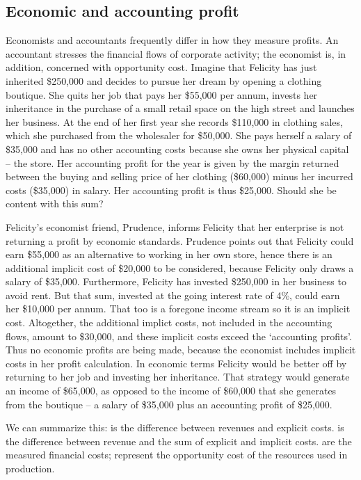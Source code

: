 \newhtmlpage

\subsection*{Economic and accounting profit}

Economists and accountants frequently differ in how they measure profits. An
accountant stresses the financial flows of corporate activity; the economist
is, in addition, concerned with opportunity cost. Imagine that Felicity has
just inherited \$250,000 and decides to pursue her dream by opening a
clothing boutique. She quits her job that pays her \$55,000 per annum,
invests her inheritance in the purchase of a small retail space on the high
street and launches her business. At the end of her first year she records
\$110,000 in clothing sales, which she purchased from the wholesaler for
\$50,000. She pays herself a salary of \$35,000 and has no other accounting
costs because she owns her physical capital -- the store. Her accounting
profit for the year is given by the margin returned between the buying and
selling price of her clothing (\$60,000) minus her incurred costs
(\$35,000) in salary. Her accounting profit is thus \$25,000. Should she be
content with this sum?

Felicity's economist friend, Prudence, informs Felicity that her enterprise
is not returning a profit by economic standards. Prudence points out that
Felicity could earn \$55,000 as an alternative to working in her own store,
hence there is an additional implicit cost of \$20,000 to be considered,
because Felicity only draws a salary of \$35,000. Furthermore, Felicity has
invested \$250,000 in her business to avoid rent. But that sum, invested at
the going interest rate of 4\%, could earn her \$10,000 per annum. That too
is a foregone income stream so it is an implicit cost. Altogether, the
additional implict costs, not included in the accounting flows, amount to
\$30,000, and these implicit costs exceed the `accounting profits'. Thus no
economic profits are being made, because the economist includes implicit
costs in her profit calculation. In economic terms Felicity would be better
off by returning to her job and investing her inheritance. That strategy
would generate an income of \$65,000, as opposed to the income of \$60,000
that she generates from the boutique -- a salary of \$35,000 plus an
accounting profit of \$25,000.

\newhtmlpage

We can summarize this:  is the difference
between revenues and explicit costs.  is the
difference between revenue and the sum of explicit and implicit costs. 
 are the measured financial costs;
 represent the opportunity cost of the resources
used in production.

